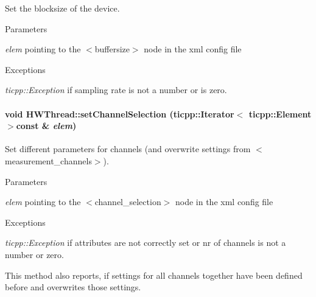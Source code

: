 Set the blocksize of the device. 
\begin{DoxyParams}{Parameters}
\item[{\em elem}]pointing to the $<$buffersize$>$ node in the xml config file \end{DoxyParams}

\begin{DoxyExceptions}{Exceptions}
\item[{\em ticpp::Exception}]if sampling rate is not a number or is zero. \end{DoxyExceptions}
\hypertarget{class_h_w_thread_a6ed2a51d2a3a7b9313d1c33f5f507c57}{
\paragraph[{setChannelSelection}]{\setlength{\rightskip}{0pt plus 5cm}void HWThread::setChannelSelection (ticpp::Iterator$<$ ticpp::Element $>$const \& {\em elem})}\hfill}
\label{class_h_w_thread_a6ed2a51d2a3a7b9313d1c33f5f507c57}


Set different parameters for channels (and overwrite settings from $<$measurement\_\-channels$>$). 
\begin{DoxyParams}{Parameters}
\item[{\em elem}]pointing to the $<$channel\_\-selection$>$ node in the xml config file \end{DoxyParams}

\begin{DoxyExceptions}{Exceptions}
\item[{\em ticpp::Exception}]if attributes are not correctly set or nr of channels is not a number or zero.\end{DoxyExceptions}
This method also reports, if settings for all channels together have been defined before and overwrites those settings. 


